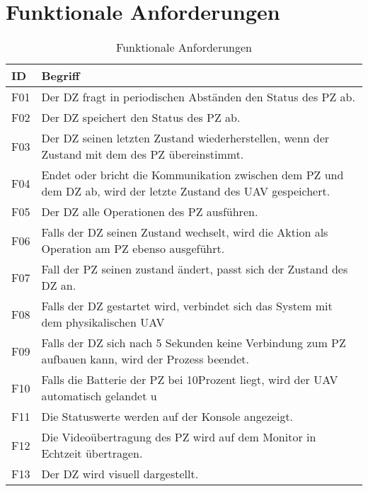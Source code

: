 \section{Funktionale Anforderungen}

\begin{table}[h]
\begin{tabular}{ l p{12cm}}
    ID & Begriff  \\
    \hline
    F01 & Der DZ fragt in periodischen Abständen den Status des PZ ab. \\
    F02 & Der DZ speichert den Status des PZ ab. \\
    F03 & Der DZ seinen letzten Zustand wiederherstellen, wenn der Zustand mit dem des PZ übereinstimmt. \\
    F04 & Endet oder bricht die Kommunikation zwischen dem PZ und dem DZ ab, wird der letzte Zustand des UAV gespeichert. \\
    F05 & Der DZ alle Operationen des PZ ausführen. \\
    F06 & Falls der DZ seinen Zustand wechselt, wird die Aktion als Operation am PZ ebenso ausgeführt. \\
    F07 & Fall der PZ seinen zustand ändert, passt sich der Zustand des DZ an. \\
    F08 & Falls der DZ gestartet wird, verbindet sich das System mit dem physikalischen UAV \\
    F09 & Falls der DZ sich nach 5 Sekunden keine Verbindung zum PZ aufbauen kann, wird der Prozess beendet. \\
    F10 & Falls die Batterie der PZ bei 10Prozent liegt, wird der UAV automatisch gelandet u \\
    F11 & Die Statuswerte werden auf der Konsole angezeigt. \\
    F12 & Die Videoübertragung des PZ wird auf dem Monitor in Echtzeit übertragen. \\
    F13 & Der DZ wird visuell dargestellt.
   
\end{tabular}
\caption{Funktionale Anforderungen}\label{table:Funktionale Anforderungen}

\end{table}